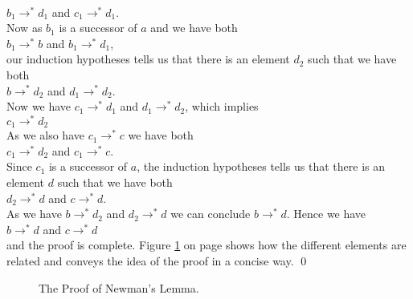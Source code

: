 \\[0.2cm]
\hspace*{1.3cm}
$b_1 \rightarrow^* d_1$ \quad and \quad $c_1 \rightarrow^* d_1$.
\\[0.2cm]
Now as $b_1$ is a successor of $a$ and we have both
\\[0.2cm]
\hspace*{1.3cm}
$b_1 \rightarrow^* b$ \quad and \quad $b_1 \rightarrow^* d_1$,
\\[0.2cm]
our induction hypotheses tells us that there is an element $d_2$ such that we have both
\\[0.2cm]
\hspace*{1.3cm}
$b \rightarrow^* d_2$ \quad and \quad $d_1 \rightarrow^* d_2$.
\\[0.2cm]
Now we have $c_1 \rightarrow^* d_1$ and $d_1 \rightarrow^* d_2$, which implies
\\[0.2cm]
\hspace*{1.3cm}
$c_1 \rightarrow^* d_2$
\\[0.2cm]
As we also have $c_1 \rightarrow^* c$ we have both
\\[0.2cm]
\hspace*{1.3cm}
$c_1 \rightarrow^* d_2$ \quad and \quad $c_1 \rightarrow^* c$.
\\[0.2cm]
Since $c_1$ is a successor of $a$, the induction hypotheses tells us that there is an element $d$ such that we
have both
\\[0.2cm]
\hspace*{1.3cm}
$d_2 \rightarrow^* d$ \quad and \quad $c \rightarrow^* d$.
\\[0.2cm]
As we have $b \rightarrow^* d_2$ and $d_2 \rightarrow^* d$ we can conclude $b \rightarrow^* d$.  Hence we have
\\[0.2cm]
\hspace*{1.3cm}
$b \rightarrow^* d$ \quad  and \quad $c \rightarrow^* d$
\\[0.2cm]
and the proof is complete.  Figure \ref{fig:newman.pdf} on page \pageref{fig:newman.pdf} shows how the
different elements are related and conveys the idea of the proof in a concise way. \qed

\begin{figure}[!ht]
  \centering
  \caption{The Proof of Newman's Lemma.}
  \label{fig:newman.pdf}
\end{figure}

